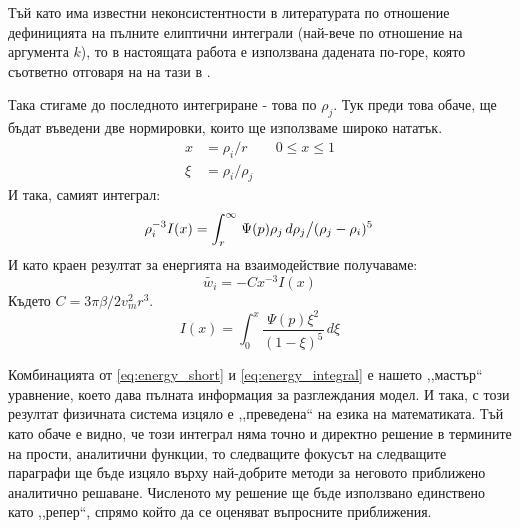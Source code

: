 Тъй като има известни неконсистентности в литературата по отношение дефиницията на пълните елиптични интеграли (най-вече по отношение на аргумента $k$), то в настоящата работа е използвана дадената по-горе, която съответно отговаря на на тази в \cite{gradshteyn}.

Така стигаме до последното интегриране - това по $\rho_j$. Тук преди това обаче, ще бъдат въведени две нормировки, които ще използваме широко нататък.
\begin{align*}
	x   & = \rho_i/r      &  & 0 \le x \le 1 \\
	\xi & = \rho_i/\rho_j
\end{align*}
И така, самият интеграл:
\begin{equation}
	\rho_{i}^{-3} I(x) = \displaystyle\int_{r}^{\infty} \left. \Psi(p)\rho_j \,d\rho_j \middle/ (\rho_j-\rho_i)^5 \right.
	\label{eq:integral_energy_non_normalized}
\end{equation}
И като краен резултат за енергията на взаимодействие получаваме:
\begin{equation}
	\tilde{w_i} = -C x^{-3} I(x)
	\label{eq:energy_short}
\end{equation}
Където $ C = 3 \pi \beta / 2 v_{m}^2 r^3 $.
\begin{equation}
	I(x) = \displaystyle\int_{0}^{x} \frac{\Psi(p) \xi^2}{(1-\xi)^5}  \,d\xi
	\label{eq:energy_integral}
\end{equation}

Комбинацията от \autoref{eq:energy_short} и \autoref{eq:energy_integral} е нашето ,,мастър`` уравнение, което дава пълната информация за разглеждания модел.
И така, с този резултат физичната система изцяло е ,,преведена`` на езика на математиката. Тъй като обаче е видно, че този интеграл няма точно и директно решение в термините на прости,
аналитични функции, то следващите фокусът на следващите параграфи ще бъде изцяло върху най-добрите методи за неговото приближено аналитично решаване. Численото му решение ще бъде използвано
единствено като ,,репер``, спрямо който да се оценяват въпросните приближения.

